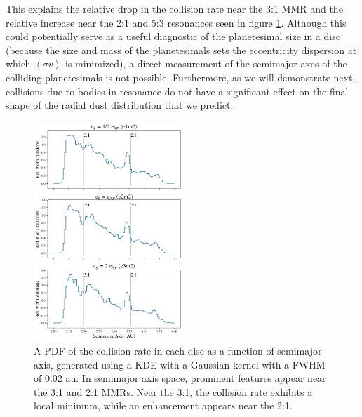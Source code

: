 \documentclass[fleqn,usenatbib]{mnras}
\begin{document}
This explains the relative drop in the collision rate near the 3:1 MMR and the relative increase near the 2:1 and 5:3 resonances seen in figure \ref{fig:coll_hist_a}. Although 
this could potentially serve as a useful diagnostic of the planetesimal size in a disc (because the size and mass of the planetesimals sets the eccentricity dispersion at which 
$\left< \sigma v \right>$ is minimized), a direct measurement of the semimajor axes of the colliding planetesimals is not possible. Furthermore, as we will demonstrate next, collisions due 
to bodies in resonance do not have a significant effect on the final shape of the radial dust distribution that we predict.

\begin{figure}
\begin{center}
    \includegraphics[width=0.5\textwidth]{figures/coll_hist_a.png}
    \caption{A PDF of the collision rate in each disc as a function of semimajor axis, generated using a KDE with a Gaussian kernel with a FWHM of 0.02 au. In semimajor axis space, 
    prominent features appear near the 3:1 and 2:1 MMRs. Near the 3:1, the collision rate exhibits a local minimum, while an enhancement appears near the 
    2:1.\label{fig:coll_hist_a}}
\end{center}
\end{figure}
\end{document}
